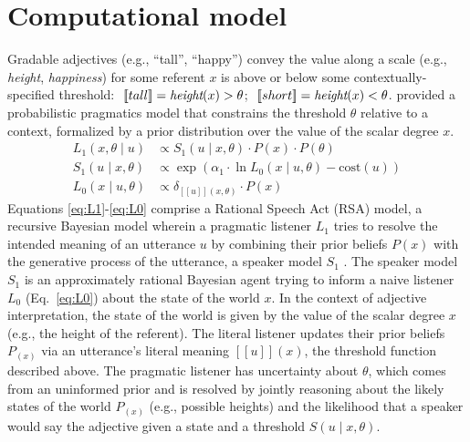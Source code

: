 \documentclass[10pt,letterpaper]{article}
\newcommand{\denote}[1]{\mbox{ $[\![ #1 ]\!]$}}
\begin{document}
\section{Computational model}

Gradable adjectives (e.g., ``tall'', ``happy'') convey the value along a scale (e.g., \emph{height}, \emph{happiness}) for some referent $x$ is above or below some contextually-specified threshold: $\denote{tall} = \emph{height}(x) > \theta$; $\denote{short} = \emph{height}(x) < \theta$.
 provided a probabilistic pragmatics model that constrains the threshold $\theta$ relative to a context, formalized by a prior distribution over the value of the scalar degree $x$.  
%
\begin{align}
L_{1}(x, \theta \mid u) &\propto S_{1}(u \mid x, \theta) \cdot P(x) \cdot P(\theta) \label{eq:L1} \\
S_{1}(u \mid x, \theta) &\propto \exp{(\alpha_1 \cdot \ln {L_{0}(x \mid u, \theta)} - \text{cost}(u))} \label{eq:S1}\\
L_{0}(x \mid u, \theta) &\propto {\delta_{[\![u]\!](x, \theta)} \cdot P(x)} \label{eq:L0}
\end{align}
%
Equations \ref{eq:L1}-\ref{eq:L0} comprise a Rational Speech Act (RSA) model, a recursive Bayesian model wherein a pragmatic listener $L_1$ tries to resolve the intended meaning of an utterance $u$ by combining their prior beliefs $P(x)$ with the generative process of the utterance, a speaker model $S_1$ \cite<for a review, see>{Goodman2016:RSA}.
The speaker model $S_1$  is an approximately rational Bayesian agent trying 
to inform a naive listener $L_0$ (Eq.~\ref{eq:L0}) about the state of the world $x$.
In the context of adjective interpretation, the state of the world is given by the value of the scalar degree $x$ (e.g., the height of the referent).
The literal listener updates their prior beliefs $P_(x)$ via an utterance's literal meaning $[\![u]\!](x)$, the threshold function described above.
The pragmatic listener has uncertainty about $\theta$, which comes from an uninformed prior and is resolved by jointly reasoning about the likely states of the world $P_(x)$ (e.g., possible heights) and the likelihood that a speaker would say the adjective given a state and a threshold $S(u \mid x, \theta)$.
\end{document}
